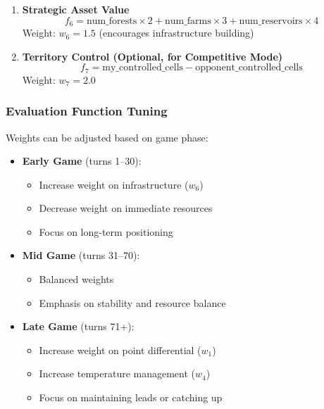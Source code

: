 \documentclass[12pt,a4paper]{article}
\begin{document}
\begin{enumerate}
    \item \textbf{Strategic Asset Value}
    \begin{equation}
    f_6 = \text{num\_forests} \times 2 + \text{num\_farms} \times 3 + \text{num\_reservoirs} \times 4
    \end{equation}
    Weight: $w_6 = 1.5$ (encourages infrastructure building)
    
    \item \textbf{Territory Control (Optional, for Competitive Mode)}
    \begin{equation}
    f_7 = \text{my\_controlled\_cells} - \text{opponent\_controlled\_cells}
    \end{equation}
    Weight: $w_7 = 2.0$
\end{enumerate}

\subsubsection{Evaluation Function Tuning}

Weights can be adjusted based on game phase:

\begin{itemize}
    \item \textbf{Early Game} (turns 1--30):
    \begin{itemize}
        \item Increase weight on infrastructure ($w_6$)
        \item Decrease weight on immediate resources
        \item Focus on long-term positioning
    \end{itemize}
    
    \item \textbf{Mid Game} (turns 31--70):
    \begin{itemize}
        \item Balanced weights
        \item Emphasis on stability and resource balance
    \end{itemize}
    
    \item \textbf{Late Game} (turns 71+):
    \begin{itemize}
        \item Increase weight on point differential ($w_1$)
        \item Increase temperature management ($w_4$)
        \item Focus on maintaining leads or catching up
    \end{itemize}
\end{itemize}
\end{document}

